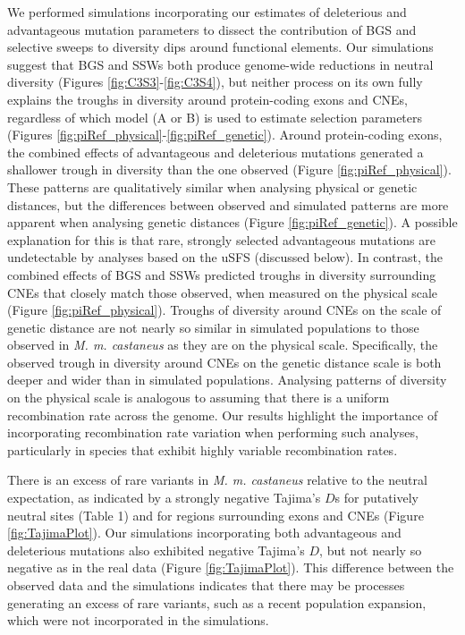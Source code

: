 	We performed simulations incorporating our estimates of deleterious and advantageous mutation parameters to dissect the contribution of BGS and selective sweeps to diversity dips around functional elements. Our simulations suggest that BGS and SSWs both produce genome-wide reductions in neutral diversity (Figures \ref{fig:C3S3}-\ref{fig:C3S4}), but neither process on its own fully explains the troughs in diversity around protein-coding exons and CNEs, regardless of which model (A or B) is used to estimate selection parameters (Figures \ref{fig:piRef_physical}-\ref{fig:piRef_genetic}). Around protein-coding exons, the combined effects of advantageous and deleterious mutations generated a shallower trough in diversity than the one observed (Figure \ref{fig:piRef_physical}). These patterns are qualitatively similar when analysing physical or genetic distances, but the differences between observed and simulated patterns are more apparent when analysing genetic distances (Figure \ref{fig:piRef_genetic}). A possible explanation for this is that rare, strongly selected advantageous mutations are undetectable by analyses based on the uSFS (discussed below). In contrast, the combined effects of BGS and SSWs predicted troughs in diversity surrounding CNEs that closely match those observed, when measured on the physical scale (Figure \ref{fig:piRef_physical}). Troughs of diversity around CNEs on the scale of genetic distance are not nearly so similar in simulated populations to those observed in \textit{M. m. castaneus} as they are on the physical scale. Specifically, the observed trough in diversity around CNEs on the genetic distance scale is both deeper and wider than in simulated populations. Analysing patterns of diversity on the physical scale is analogous to assuming that there is a uniform recombination rate across the genome. Our results highlight the importance of incorporating recombination rate variation when performing such analyses, particularly in species that exhibit highly variable recombination rates.

	There is an excess of rare variants in \textit{M. m. castaneus} relative to the neutral expectation, as indicated by a strongly negative Tajima's $D$s for putatively neutral sites (Table 1) and for regions surrounding exons and CNEs (Figure \ref{fig:TajimaPlot}). Our simulations incorporating both advantageous and deleterious mutations also exhibited negative Tajima's $D$, but not nearly so negative as in the real data (Figure \ref{fig:TajimaPlot}). This difference between the observed data and the simulations indicates that there may be processes generating an excess of rare variants, such as a recent population expansion, which were not incorporated in the simulations.

